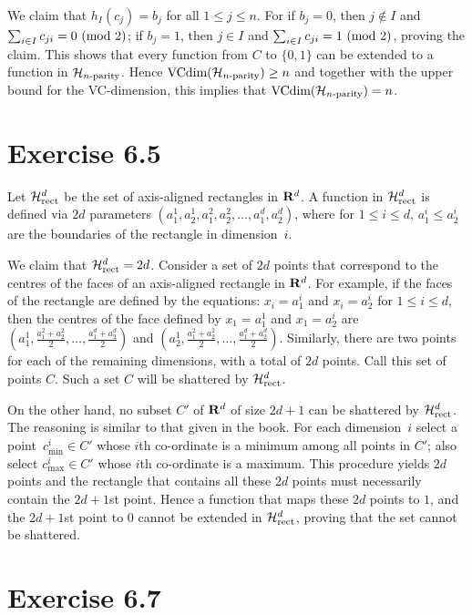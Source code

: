 We claim that $h_I(c_j) = b_j$ for all $1 \leq j \leq n$. For if $b_j = 0$, 
then $j \notin I$ and $\sum_{i \in I} c_{j i} = 0 \ (\mathrm{mod}\ 2)$; if $b_j = 1$,
then $j \in I$ and $\sum_{i \in I} c_{j i} = 1 \ (\mathrm{mod}\ 2)$, proving the claim. 
This shows that every function from $C$ to $\{0, 1\}$ can be extended to a function
in $\mathcal{H}_{n\text{-parity}}$. Hence $\text{VCdim} (\mathcal{H}_{n\text{-parity}}) \geq n$ and together with the upper 
bound for the VC-dimension, this implies that $\text{VCdim} (\mathcal{H}_{n\text{-parity}}) = n$.

\section*{Exercise 6.5}

Let $\mathcal{H}_{\text{rect}}^{d}$ be the set of axis-aligned rectangles in $\mathbf{R}^{d}$. A function
in $\mathcal{H}_{\text{rect}}^{d}$ is defined via $2d$ parameters $(a_1^1, a_2^1, a_1^2, a_2^2,
\ldots, a_1^d, a_2^d)$, where for $1 \leq i \leq d$, $a_1^i \leq a_2^i$ are the
boundaries of the rectangle in dimension~$i$. 

We claim that $\mathcal{H}_{\text{rect}}^{d} = 2d$. Consider a set of $2d$ points that correspond to 
the centres of the faces of an axis-aligned rectangle in $\mathbf{R}^d$. For example,
if the faces of the rectangle are defined by the equations:
$x_i  = a_1^i$ and  $x_i = a_2^i$ for $1 \leq i \leq d$,
then the centres of the face defined by $x_1 = a_1^1$ and $x_1 = a_2^i$ are 
$( a_1^1,  \frac{a_1^2 + a_2^2}{2},  \ldots, \frac{a_1^d + a_2^d}{2})$ 
and $( a_2^1,  \frac{a_1^2 + a_2^2}{2},  \ldots, \frac{a_1^d + a_2^d}{2})$. 
Similarly, there are two points for each of the remaining dimensions, with a 
total of $2d$ points. Call this set of points $C$. Such a set $C$ will be shattered
by $\mathcal{H}_{\text{rect}}^{d}$. 

On the other hand, no subset $C'$ of $\mathbf{R}^d$ of size $2d + 1$ can be
shattered by $\mathcal{H}_{\text{rect}}^{d}$. The reasoning is similar to that given in the book.
For each dimension~$i$ select a point~$c_{\text{min}}^i \in C'$ whose $i$th
co-ordinate is a minimum among all points in $C'$; also select
$c_{\text{max}}^i \in C'$ whose $i$th co-ordinate is a maximum. This procedure
yields $2d$ points and the rectangle that contains all these $2d$ points must
necessarily contain the $2d + 1$st point. Hence a function that maps these $2d$
points to $1$, and the $2d + 1$st point to $0$ cannot be extended in
$\mathcal{H}_{\text{rect}}^{d}$, proving that the set cannot be shattered. 


\section*{Exercise 6.7}

